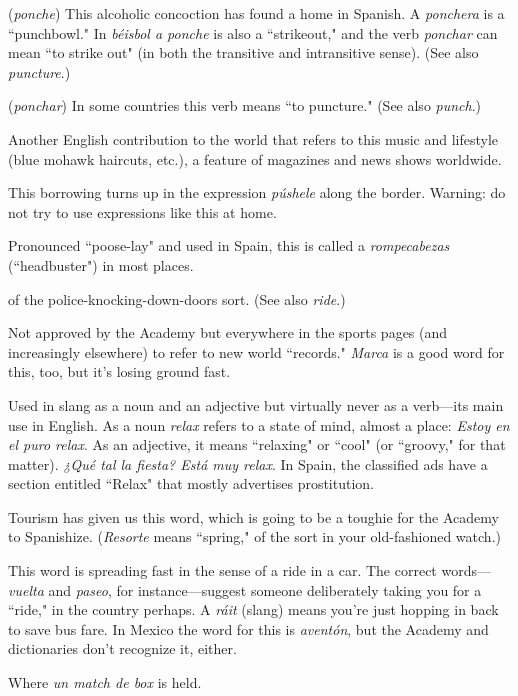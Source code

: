  (\emph{ponche}) This alcoholic concoction has found a home
in Spanish. A \emph{ponchera} is a ``punchbowl." In \emph{béisbol a ponche} is also
a ``strikeout," and the verb \emph{ponchar} can mean ``to strike out" (in both
the transitive and intransitive sense). (See also \emph{puncture}.)

 (\emph{ponchar}) In some countries this verb means ``to
puncture." (See also \emph{punch}.)

 Another English contribution to the world that refers
to this music and lifestyle (blue mohawk haircuts, etc.), a feature of
magazines and news shows worldwide.

 This borrowing turns up in the expression \emph{púshele}
along the border. Warning: do not try to use expressions like this
at home.

 Pronounced ``poose-lay" and used in Spain, this is
called a \emph{rompecabezas} (``headbuster") in most places.

 of the police-knocking-down-doors sort. (See also \emph{ride}.)

 Not approved by the Academy but everywhere in
the sports pages (and increasingly elsewhere) to refer to new world ``records." \emph{Marca} is a good word for this, too, but it's losing ground fast.

 Used in slang as a noun and an adjective but virtually
never as a verb---its main use in English. As a noun \emph{relax} refers to a
state of mind, almost a place: \emph{Estoy en el puro relax}. As an adjective, it
means ``relaxing" or ``cool" (or ``groovy," for that matter). \emph{¿Qué tal la
fiesta? Está muy relax}. In Spain, the classified ads have a section entitled ``Relax" that mostly advertises prostitution.

 Tourism has given us this word, which is going to
be a toughie for the Academy to Spanishize. (\emph{Resorte} means ``spring,"
of the sort in your old-fashioned watch.)

 This word is spreading fast in the sense of a ride in a
car. The correct words---\emph{vuelta} and \emph{paseo}, for instance---suggest someone deliberately taking you for a ``ride," in the country perhaps. A \emph{ráit}
(slang) means you're just hopping in back to save bus fare. In Mexico
the word for this is \emph{aventón}, but the Academy and dictionaries don't
recognize it, either.

 Where \emph{un match de box} is held.

